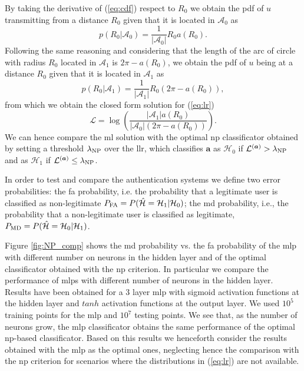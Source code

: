 \documentclass[twocolumns]{IEEEtran}
\begin{document}
By taking the derivative of (\ref{eq:cdf}) respect to $R_0$ we obtain the \ac{pdf} of $u$ transmitting from a distance $R_0$ given that it is located in $\mathcal{A}_0$ as
\begin{equation}
    p(R_0|\mathcal{A}_0) = \frac{1}{|\mathcal{A}_0|}R_0a(R_0).
\end{equation}
Following the same reasoning and considering that the length of the arc of circle with radius $R_0$ located in $\mathcal{A}_1$ is $2\pi - a(R_0)$, we obtain the \ac{pdf} of $u$ being at a distance $R_0$ given that it is located in $\mathcal{A}_1$ as
\begin{equation}
     p(R_0|\mathcal{A}_1) = \frac{1}{|\mathcal{A}_1|}R_0\left(2\pi-a(R_0)\right),
\end{equation}
from which we obtain the closed form solution for (\ref{eq:lr}) 
\begin{equation}
    \mathcal{L}=\log\left(\frac{|\mathcal{A}_1|a(R_0)}{|\mathcal{A}_0|\left(2\pi-a(R_0)\right)}\right).
\end{equation}
We can hence compare the \ac{ml} solution with the optimal \ac{np} classificator obtained by setting a threshold $\lambda_{\rm NP}$ over the \ac{llr}, which classifies $\bm{a}$ as $\mathcal{H}_0$ if $\mathcal{L}^{(\bm{a})} > \lambda_{\rm NP}$ and as $\mathcal{H}_1$ if $\mathcal{L}^{(\bm{a})} \le \lambda_{\rm NP}$.

In order to test and compare the authentication systems we define two error probabilities: the \ac{fa} probability, i.e. the probability  that a legitimate user is classified as non-legitimate $P_{\rm FA} =P(\hat{\mathcal H} = \mathcal H_1 | \mathcal H_0)$; the \ac{md} probability, i.e., the probability that a non-legitimate user is classified as legitimate, $P_{\rm MD}=P(\hat{\mathcal H} = \mathcal H_0 | \mathcal H_1)$.

Figure \ref{fig:NP_comp} shows the \ac{md} probability vs. the \ac{fa} probability of the \ac{mlp} with different number on neurons in the hidden layer and of the optimal classificator obtained with the  \ac{np} criterion. In particular we compare the performance of \acp{mlp} with different number of neurons in the hidden layer. Results have been obtained for a $3$ layer \ac{mlp} with sigmoid activation functions at the hidden layer and $tanh$ activation functions at the output layer. We used $10^5$ training points for the \ac{mlp} and $10^7$ testing points. We see that, as the number of neurons grow, the \ac{mlp} classificator obtains the same performance of the optimal \ac{np}-based classificator. Based on this results we henceforth consider the results obtained with the \ac{mlp} as the optimal ones, neglecting hence the comparison with the \ac{np} criterion for scenarios where the distributions in (\ref{eq:lr}) are not available.
\end{document}
